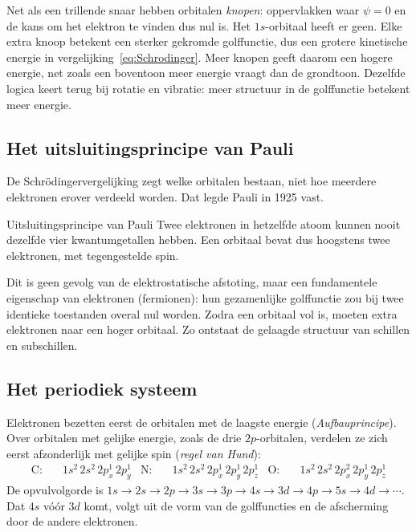 Net als een trillende snaar hebben orbitalen \emph{knopen}: oppervlakken waar $\psi = 0$ en de kans om het elektron te vinden dus nul is. Het $1s$-orbitaal heeft er geen. Elke extra knoop betekent een sterker gekromde golffunctie, dus een grotere kinetische energie in vergelijking~\eqref{eq:Schrodinger}. Meer knopen geeft daarom een hogere energie, net zoals een boventoon meer energie vraagt dan de grondtoon. Dezelfde logica keert terug bij rotatie en vibratie: meer structuur in de golffunctie betekent meer energie.

\subsection{Het uitsluitingsprincipe van Pauli}

De Schr\"odingervergelijking zegt welke orbitalen bestaan, niet hoe meerdere elektronen erover verdeeld worden. Dat legde Pauli in 1925 vast.

\begin{definitie}{Uitsluitingsprincipe van Pauli}
Twee elektronen in hetzelfde atoom kunnen nooit dezelfde vier kwantumgetallen hebben. Een orbitaal bevat dus hoogstens twee elektronen, met tegengestelde spin.
\end{definitie}

Dit is geen gevolg van de elektrostatische afstoting, maar een fundamentele eigenschap van elektronen (fermionen): hun gezamenlijke golffunctie zou bij twee identieke toestanden overal nul worden. Zodra een orbitaal vol is, moeten extra elektronen naar een hoger orbitaal. Zo ontstaat de gelaagde structuur van schillen en subschillen.

\subsection{Het periodiek systeem}

Elektronen bezetten eerst de orbitalen met de laagste energie (\emph{Aufbauprincipe}). Over orbitalen met gelijke energie, zoals de drie $2p$-orbitalen, verdelen ze zich eerst afzonderlijk met gelijke spin (\emph{regel van Hund}):
\begin{align*}
\text{C:}  &\quad 1s^2\,2s^2\,2p^1_x\, 2p^1_y &
\text{N:}  &\quad 1s^2\,2s^2\,2p^1_x\,2p^1_y\,2p^1_z &
\text{O:}  &\quad 1s^2\,2s^2\,2p^2_x\,2p^1_y\,2p^1_z
\end{align*}
De opvulvolgorde is $1s \to 2s \to 2p \to 3s \to 3p \to 4s \to 3d \to 4p \to 5s \to 4d \to \cdots$. Dat $4s$ vóór $3d$ komt, volgt uit de vorm van de golffuncties en de afscherming door de andere elektronen.

